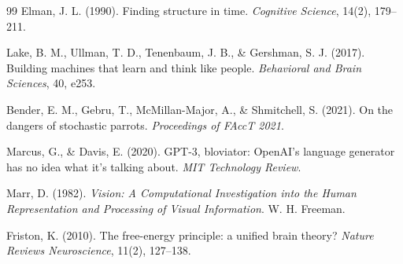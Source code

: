 \documentclass[11pt]{article}
\begin{document}
\begin{thebibliography}{99}
Elman, J. L. (1990).
\newblock Finding structure in time.
\newblock \emph{Cognitive Science}, 14(2), 179--211.

Lake, B. M., Ullman, T. D., Tenenbaum, J. B., \& Gershman, S. J. (2017).
\newblock Building machines that learn and think like people.
\newblock \emph{Behavioral and Brain Sciences}, 40, e253.

Bender, E. M., Gebru, T., McMillan-Major, A., \& Shmitchell, S. (2021).
\newblock On the dangers of stochastic parrots.
\newblock \emph{Proceedings of FAccT 2021}.

Marcus, G., \& Davis, E. (2020).
\newblock GPT-3, bloviator: OpenAI’s language generator has no idea what it’s talking about.
\newblock \emph{MIT Technology Review}.

Marr, D. (1982).
\newblock \emph{Vision: A Computational Investigation into the Human Representation and Processing of Visual Information}.
\newblock W. H. Freeman.

Friston, K. (2010).
\newblock The free-energy principle: a unified brain theory?
\newblock \emph{Nature Reviews Neuroscience}, 11(2), 127--138.

\end{thebibliography}
\end{document}
